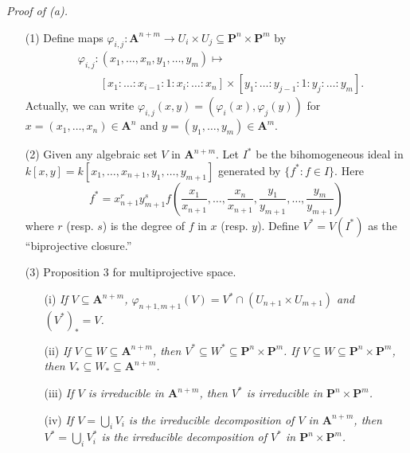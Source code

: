 \documentclass{article}
\begin{document}
\emph{Proof of (a).}
\begin{enumerate}
\item[(1)]
  Define maps
  $\varphi_{i,j}: \mathbf{A}^{n+m}
  \to
  U_i \times U_j
  \subseteq
  \mathbf{P}^{n} \times \mathbf{P}^{m}$
  by
  \begin{align*}
    &
    \varphi_{i,j}:
    (x_1, \ldots, x_{n}, y_1, \ldots, y_{m})
    \mapsto \\
    &\qquad
      [x_1 : \ldots : x_{i-1} : 1 : x_{i} : \ldots : x_{n}] \times
      [y_1 : \ldots : y_{j-1} : 1 : y_{j} : \ldots : y_{m}].
  \end{align*}
  Actually, we can write
  $\varphi_{i,j}(x, y) = (\varphi_i(x), \varphi_j(y))$
  for $x = (x_1, \ldots, x_{n}) \in \mathbf{A}^{n}$ and
  $y = (y_1, \ldots, y_{m}) \in \mathbf{A}^{m}$.

\item[(2)]
  Given any algebraic set $V$ in $\mathbf{A}^{n+m}$.
  Let $I^{*}$ be the bihomogeneous ideal in
  $k[x,y] = k[x_1, \ldots, x_{n+1}, y_1, \ldots, y_{m+1}]$
  generated by $\{ f^{*} : f \in I \}$.
  Here
  \[
    f^{*}
    =
    x_{n+1}^{r} y_{m+1}^{s}
    f\left( \frac{x_1}{x_{n+1}}, \ldots, \frac{x_{n}}{x_{n+1}},
      \frac{y_1}{y_{m+1}}, \ldots, \frac{y_{m}}{y_{m+1}} \right)
  \]
  where $r$ (resp. $s$) is the degree of $f$ in $x$ (resp. $y$).
  Define $V^{*} = V(I^{*})$ as the ``biprojective closure.''

\item[(3)]
  Proposition 3 for multiprojective space.
  \begin{enumerate}
  \item[(i)]
    \emph{If $V \subseteq \mathbf{A}^{n+m}$,
    $\varphi_{n+1,m+1}(V) = V^{*} \cap (U_{n+1} \times U_{m+1})$
    and $(V^{*})_{*}= V$.}

  \item[(ii)]
    \emph{If $V \subseteq W \subseteq \mathbf{A}^{n+m}$,
    then $V^{*} \subseteq W^{*} \subseteq \mathbf{P}^{n} \times \mathbf{P}^{m}$.
    If $V \subseteq W \subseteq \mathbf{P}^{n} \times \mathbf{P}^{m}$,
    then $V_{*} \subseteq W_{*} \subseteq \mathbf{A}^{n+m}$.}

  \item[(iii)]
    \emph{If $V$ is irreducible in $\mathbf{A}^{n+m}$,
    then $V^{*}$ is irreducible in $\mathbf{P}^{n} \times \mathbf{P}^{m}$.}

  \item[(iv)]
    \emph{If $V = \bigcup_{i} V_i$ is the irreducible decomposition of $V$ in $\mathbf{A}^{n+m}$,
    then $V^{*} = \bigcup_{i} V_i^{*}$ is the irreducible decomposition of $V^{*}$
    in $\mathbf{P}^{n} \times \mathbf{P}^{m}$.}


\end{enumerate}
\end{enumerate}
\end{document}
